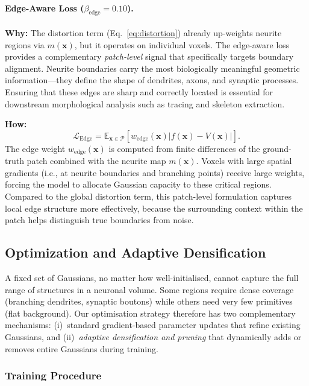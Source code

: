 \documentclass[11pt,a4paper]{article}
\begin{document}
\paragraph{Edge-Aware Loss ($\beta_{\text{edge}} = 0.10$).}
\textbf{Why:} The distortion term (Eq.~\ref{eq:distortion}) already up-weights neurite regions via $m(\mathbf{x})$, but it operates on individual voxels.  The edge-aware loss provides a complementary \emph{patch-level} signal that specifically targets boundary alignment.  Neurite boundaries carry the most biologically meaningful geometric information---they define the shape of dendrites, axons, and synaptic processes.  Ensuring that these edges are sharp and correctly located is essential for downstream morphological analysis such as tracing and skeleton extraction.

\textbf{How:}
\begin{equation}
\mathcal{L}_{\mathrm{Edge}} = \mathbb{E}_{\mathbf{x}\in\mathcal{P}}\left[w_{\mathrm{edge}}(\mathbf{x})|f(\mathbf{x})-V(\mathbf{x})|\right].
\label{eq:edge}
\end{equation}
The edge weight $w_{\mathrm{edge}}(\mathbf{x})$ is computed from finite differences of the ground-truth patch combined with the neurite map $m(\mathbf{x})$.  Voxels with large spatial gradients (i.e., at neurite boundaries and branching points) receive large weights, forcing the model to allocate Gaussian capacity to these critical regions.  Compared to the global distortion term, this patch-level formulation captures local edge structure more effectively, because the surrounding context within the patch helps distinguish true boundaries from noise.

\subsection{Optimization and Adaptive Densification}
\label{subsec:optimization}

A fixed set of Gaussians, no matter how well-initialised, cannot capture the full range of structures in a neuronal volume.  Some regions require dense coverage (branching dendrites, synaptic boutons) while others need very few primitives (flat background).  Our optimisation strategy therefore has two complementary mechanisms: (i)~standard gradient-based parameter updates that refine existing Gaussians, and (ii)~\emph{adaptive densification and pruning} that dynamically adds or removes entire Gaussians during training.

\subsubsection{Training Procedure}
\end{document}
